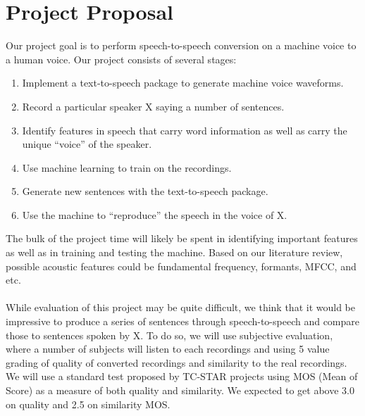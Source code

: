 \documentclass[11pt]{article}
\begin{document}
\section{Project Proposal}
Our project goal is to perform speech-to-speech conversion on a machine voice to a human voice. Our project consists of several stages:
\begin{enumerate}
\item Implement a text-to-speech package to generate machine voice waveforms.
\item Record a particular speaker X saying a number of sentences.
\item Identify features in speech that carry word information as well as carry the unique ``voice'' of the speaker.
\item Use machine learning  to train on the recordings.
\item Generate new sentences with the text-to-speech package.
\item Use the machine to ``reproduce'' the speech in the voice of X.
\end{enumerate}
The bulk of the project time will likely be spent in identifying important features as well as in training and testing the machine. Based on our literature review, possible acoustic features could be fundamental frequency, formants, MFCC, and etc. \\
\\
While evaluation of this project may be quite difficult, we think that it would be impressive to produce a series of sentences through speech-to-speech and compare those to sentences spoken by X. To do so, we will use subjective evaluation, where a number of subjects will listen to each recordings and using 5 value grading of quality of converted recordings and similarity to the real recordings. We will use a standard test proposed by TC-STAR\cite{erro2007weighted} projects using MOS (Mean of Score) as a measure of both quality and similarity. We expected to get above 3.0 on quality and 2.5 on similarity MOS.



\end{document}
